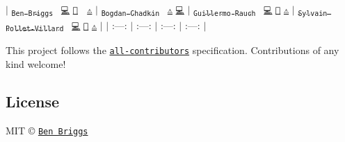 $\vert$ \href{http://beneb.info}{\tt \textsubscript{Ben Briggs}}~\newline
\href{https://github.com/ben-eb/postcss-reduce-idents/commits?author=ben-eb}{\tt 💻} \href{https://github.com/ben-eb/postcss-reduce-idents/commits?author=ben-eb}{\tt 📖} 👀 \href{https://github.com/ben-eb/postcss-reduce-idents/commits?author=ben-eb}{\tt ⚠️} $\vert$ \href{https://github.com/TrySound}{\tt \textsubscript{Bogdan Chadkin}}~\newline
\href{https://github.com/ben-eb/postcss-reduce-idents/commits?author=TrySound}{\tt ⚠️} \href{https://github.com/ben-eb/postcss-reduce-idents/commits?author=TrySound}{\tt 💻} $\vert$ \href{http://twitter.com/rauchg}{\tt \textsubscript{Guillermo Rauch}}~\newline
\href{https://github.com/ben-eb/postcss-reduce-idents/commits?author=rauchg}{\tt 💻} \href{https://github.com/ben-eb/postcss-reduce-idents/commits?author=rauchg}{\tt 📖} \href{https://github.com/ben-eb/postcss-reduce-idents/commits?author=rauchg}{\tt ⚠️} $\vert$ \href{https://github.com/sylvainpolletvillard}{\tt \textsubscript{Sylvain Pollet-\/\+Villard}}~\newline
\href{https://github.com/ben-eb/postcss-reduce-idents/commits?author=sylvainpolletvillard}{\tt 💻} \href{https://github.com/ben-eb/postcss-reduce-idents/commits?author=sylvainpolletvillard}{\tt 📖} \href{https://github.com/ben-eb/postcss-reduce-idents/commits?author=sylvainpolletvillard}{\tt ⚠️} $\vert$ $\vert$ \+:---\+: $\vert$ \+:---\+: $\vert$ \+:---\+: $\vert$ \+:---\+: $\vert$

This project follows the \href{https://github.com/kentcdodds/all-contributors}{\tt all-\/contributors} specification. Contributions of any kind welcome!

\subsection*{License}

M\+IT © \href{http://beneb.info}{\tt Ben Briggs} 